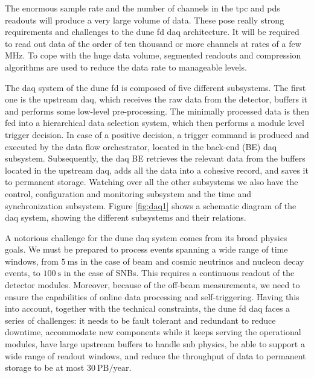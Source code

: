 The enormous sample rate and the number of channels in the \gls{tpc} and \gls{pds} readouts will produce a very large volume of data. These pose really strong requirements and challenges to the \gls{dune} \gls{fd} \gls{daq} architecture. It will be required to read out data of the order of ten thousand or more channels at rates of a few MHz. To cope with the huge data volume, segmented readouts and compression algorithms are used to reduce the data rate to manageable levels.

The \gls{daq} system of the \gls{dune} \gls{fd} is composed of five different subsystems. The first one is the upstream \gls{daq}, which receives the raw data from the detector, buffers it and performs some low-level pre-processing. The minimally processed data is then fed into a hierarchical data selection system, which then performs a module level trigger decision. In case of a positive decision, a trigger command is produced and executed by the data flow orchestrator, located in the back-end (BE) \gls{daq} subsystem. Subsequently, the \gls{daq} BE retrieves the relevant data from the buffers located in the upstream \gls{daq}, adds all the data into a cohesive record, and saves it to permanent storage. Watching over all the other subsystems we also have the control, configuration and monitoring subsystem and the time and synchronization subsystem. Figure \ref{fig:daq1} shows a schematic diagram of the \gls{daq} system, showing the different subsystems and their relations.

A notorious challenge for the \gls{dune} \gls{daq} system comes from its broad physics goals. We must be prepared to process events spanning a wide range of time windows, from $5 \ \mathrm{ms}$ in the case of beam and cosmic neutrinos and nucleon decay events, to $100 \ \mathrm{s}$ in the case of SNBs. This requires a continuous readout of the detector modules. Moreover, because of the off-beam measurements, we need to ensure the capabilities of online data processing and self-triggering. Having this into account, together with the technical constraints, the \gls{dune} \gls{fd} \gls{daq} faces a series of challenges: it needs to be fault tolerant and redundant to reduce downtime, accommodate new components while it keeps serving the operational modules, have large upstream buffers to handle \gls{snb} physics, be able to support a wide range of readout windows, and reduce the throughput of data to permanent storage to be at most $30 \ \mathrm{PB/year}$.